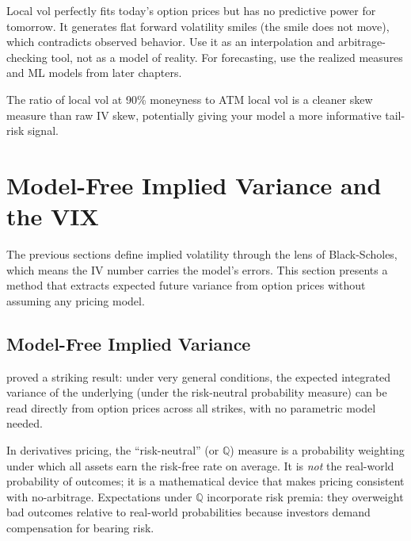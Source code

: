 \begin{warning}
Local vol perfectly fits today's option prices but has no predictive power for tomorrow.
It generates flat forward volatility smiles (the smile does not move), which contradicts observed behavior.
Use it as an interpolation and arbitrage-checking tool, not as a model of reality.
For forecasting, use the realized measures and ML models from later chapters.
\end{warning}

\begin{projectconnection}
The ratio of local vol at 90\% moneyness to ATM local vol is a cleaner skew measure than raw IV skew, potentially giving your model a more informative tail-risk signal.
\end{projectconnection}


\section{Model-Free Implied Variance and the VIX}
\label{sec:vix}

The previous sections define implied volatility through the lens of Black-Scholes, which means the IV number carries the model's errors.
This section presents a method that extracts expected future variance from option prices without assuming any pricing model.

\subsection{Model-Free Implied Variance}
\label{sec:model-free}

\citet{BrittenJones2000} proved a striking result: under very general conditions, the expected integrated variance of the underlying (under the risk-neutral probability measure) can be read directly from option prices across all strikes, with no parametric model needed.

\begin{prereq}
In derivatives pricing, the ``risk-neutral'' (or $\mathbb{Q}$) measure is a probability weighting under which all assets earn the risk-free rate on average.
It is \emph{not} the real-world probability of outcomes; it is a mathematical device that makes pricing consistent with no-arbitrage.
Expectations under $\mathbb{Q}$ incorporate risk premia: they overweight bad outcomes relative to real-world probabilities because investors demand compensation for bearing risk.
\end{prereq}

